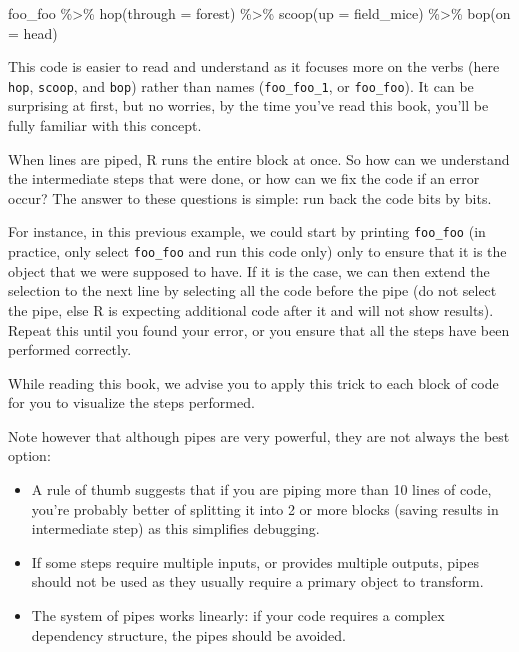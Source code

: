 \documentclass[
]{book}
\newenvironment{Shaded}{\begin{snugshade}}{\end{snugshade}}
\newcommand{\AttributeTok}[1]{\textcolor[rgb]{0.77,0.63,0.00}{#1}}
\newcommand{\FunctionTok}[1]{\textcolor[rgb]{0.00,0.00,0.00}{#1}}
\newcommand{\NormalTok}[1]{#1}
\newcommand{\SpecialCharTok}[1]{\textcolor[rgb]{0.00,0.00,0.00}{#1}}
\providecommand{\tightlist}{%
  \setlength{\itemsep}{0pt}\setlength{\parskip}{0pt}}
\begin{document}
\begin{Shaded}
\begin{Highlighting}[]
\NormalTok{foo\_foo }\SpecialCharTok{\%\textgreater{}\%} 
  \FunctionTok{hop}\NormalTok{(}\AttributeTok{through =}\NormalTok{ forest) }\SpecialCharTok{\%\textgreater{}\%} 
  \FunctionTok{scoop}\NormalTok{(}\AttributeTok{up =}\NormalTok{ field\_mice) }\SpecialCharTok{\%\textgreater{}\%} 
  \FunctionTok{bop}\NormalTok{(}\AttributeTok{on =}\NormalTok{ head)}
\end{Highlighting}
\end{Shaded}

This code is easier to read and understand as it focuses more on the verbs (here \texttt{hop}, \texttt{scoop}, and \texttt{bop}) rather than names
(\texttt{foo\_foo\_1}, or \texttt{foo\_foo}). It can be surprising at first, but no worries, by the time you've read this book, you'll be fully familiar with this concept.

When lines are piped, R runs the entire block at once. So how can we understand the intermediate steps that were done, or how can we fix the code if an error occur? The answer to these questions is simple: run back the code bits by bits.

For instance, in this previous example, we could start by printing \texttt{foo\_foo} (in practice, only select \texttt{foo\_foo} and run this code only) only to ensure that it is the object that we were supposed to have.
If it is the case, we can then extend the selection to the next line by selecting all the code before the pipe (do not select the pipe, else R is expecting additional code after it and will not show results).
Repeat this until you found your error, or you ensure that all the steps have been performed correctly.

While reading this book, we advise you to apply this trick to each block of code for you to visualize the steps performed.

Note however that although pipes are very powerful, they are not always the best option:

\begin{itemize}
\tightlist
\item
  A rule of thumb suggests that if you are piping more than 10 lines of code, you're probably better of splitting it into 2 or more blocks (saving results in intermediate step) as this simplifies debugging.
\item
  If some steps require multiple inputs, or provides multiple outputs, pipes should not be used as they usually require a primary object to transform.
\item
  The system of pipes works linearly: if your code requires a complex dependency structure, the pipes should be avoided.
\end{itemize}
\end{document}
